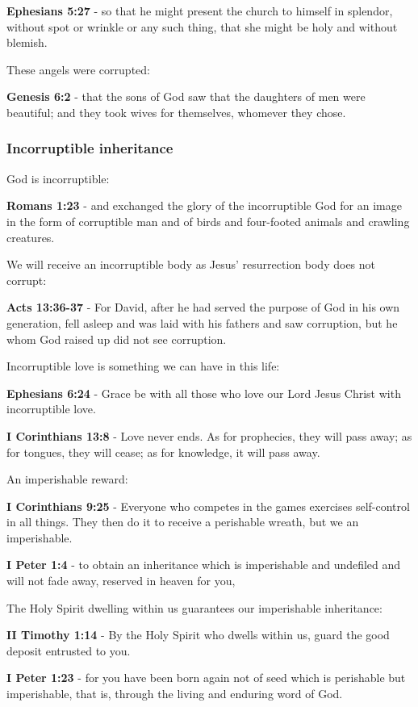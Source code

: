 \documentclass[11pt]{article}
\begin{document}
\textbf{Ephesians 5:27} - so that he might present the church to himself in splendor, without spot or wrinkle or any such thing, that she might be holy and without blemish.

These angels were corrupted:

\textbf{Genesis 6:2} - that the sons of God saw that the daughters of men were beautiful; and they took wives for themselves, whomever they chose.

\subsubsection{Incorruptible inheritance}
\label{sec:orgedf2646}
God is incorruptible:

\textbf{Romans 1:23} - and exchanged the glory of the incorruptible God for an image in the form of corruptible man and of birds and four-footed animals and crawling creatures.

We will receive an incorruptible body as Jesus' resurrection body does not corrupt:

\textbf{Acts 13:36-37} - For David, after he had served the purpose of God in his own generation, fell asleep and was laid with his fathers and saw corruption, but he whom God raised up did not see corruption.

Incorruptible love is something we can have in this life:

\textbf{Ephesians 6:24} - Grace be with all those who love our Lord Jesus Christ with incorruptible love.

\textbf{I Corinthians 13:8} - Love never ends. As for prophecies, they will pass away; as for tongues, they will cease; as for knowledge, it will pass away.

An imperishable reward:

\textbf{I Corinthians 9:25} - Everyone who competes in the games exercises self-control in all things. They then do it to receive a perishable wreath, but we an imperishable.

\textbf{I Peter 1:4} - to obtain an inheritance which is imperishable and undefiled and will not fade away, reserved in heaven for you,

The Holy Spirit dwelling within us guarantees our imperishable inheritance:

\textbf{II Timothy 1:14} - By the Holy Spirit who dwells within us, guard the good deposit entrusted to you.

\textbf{I Peter 1:23} - for you have been born again not of seed which is perishable but imperishable, that is, through the living and enduring word of God.
\end{document}
